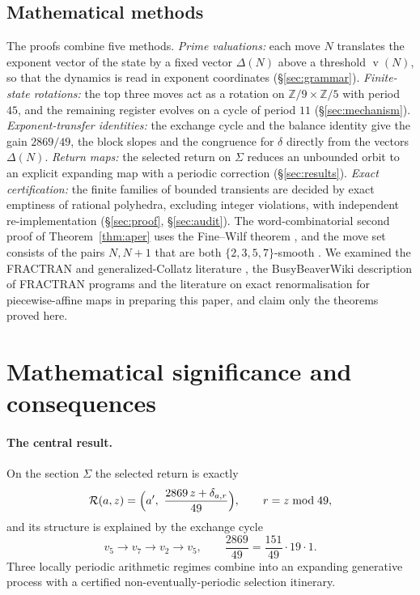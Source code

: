 \documentclass[11pt,a4paper]{article}
\theoremstyle{definition}
\newcommand{\Sig}{\Sigma}
\DeclareMathOperator{\vp}{v}
\begin{document}
\subsection{Mathematical methods}\label{subsec:methods}
The proofs combine five methods. \emph{Prime valuations:} each move $N$ translates the exponent vector of the state by a fixed vector $\Delta(N)$ above a threshold $\vp(N)$, so that the dynamics is read in exponent coordinates (\S\ref{sec:grammar}). \emph{Finite-state rotations:} the top three moves act as a rotation on $\mathbb{Z}/9\times\mathbb{Z}/5$ with period $45$, and the remaining register evolves on a cycle of period $11$ (\S\ref{sec:mechanism}). \emph{Exponent-transfer identities:} the exchange cycle and the balance identity give the gain $2869/49$, the block slopes and the congruence for $\delta$ directly from the vectors $\Delta(N)$. \emph{Return maps:} the selected return on $\Sig$ reduces an unbounded orbit to an explicit expanding map with a periodic correction (\S\ref{sec:results}). \emph{Exact certification:} the finite families of bounded transients are decided by exact emptiness of rational polyhedra, excluding integer violations, with independent re-implementation (\S\ref{sec:proof}, \S\ref{sec:audit}). The word-combinatorial second proof of Theorem~\ref{thm:aper} uses the Fine--Wilf theorem \cite{finewilf}, and the move set consists of the pairs $N,N+1$ that are both $\{2,3,5,7\}$-smooth \cite{stormer,lehmer,oeis}.
We examined the FRACTRAN and generalized-Collatz literature \cite{kurtzsimon,endrullis,monks,goncalves,lagarias}, the BusyBeaverWiki description of FRACTRAN programs \cite{bbwiki} and the literature on exact renormalisation for piecewise-affine maps \cite{schwartz,akiyama} in preparing this paper, and claim only the theorems proved here.

\section{Mathematical significance and consequences}\label{sec:signif}

\paragraph{The central result.} On the section $\Sig$ the selected return is exactly
\[
\mathcal R(a,z)=\Bigl(a',\ \frac{2869\,z+\delta_{a,r}}{49}\Bigr),\qquad r=z\bmod49,
\]
and its structure is explained by the exchange cycle
\[
v_5\longrightarrow v_7\longrightarrow v_2\longrightarrow v_5,\qquad \frac{2869}{49}=\frac{151}{49}\cdot19\cdot1 .
\]
Three locally periodic arithmetic regimes combine into an expanding generative process with a certified non-eventually-periodic selection itinerary.
\end{document}
